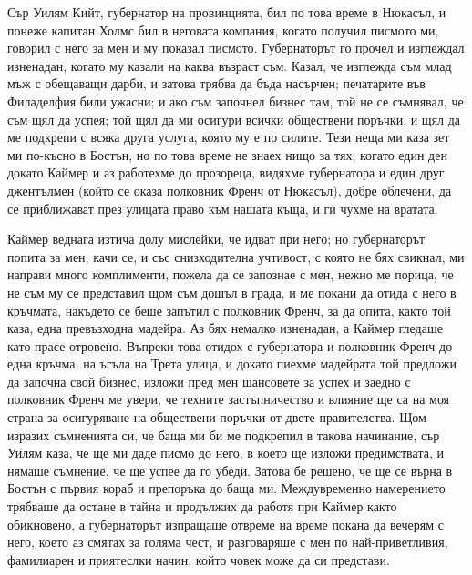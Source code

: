 \documentclass[12pt]{book}
\begin{document}
Сър Уилям Кийт, губернатор на провинцията, бил по това време в Нюкасъл, и понеже капитан Холмс бил в неговата компания, когато получил писмото ми, говорил с него за мен и му показал писмото. Губернаторът го прочел и изглеждал изненадан, когато му казали на каква възраст съм. Казал, че изглежда съм млад мъж с обещаващи дарби, и затова трябва да бъда насърчен; печатарите във Филаделфия били ужасни; и ако съм започнел бизнес там, той не се съмнявал, че съм щял да успея; той щял да ми осигури всички обществени поръчки, и щял да ме подкрепи с всяка друга услуга, която му е по силите. Тези неща ми каза зет ми по-късно в Бостън, но по това време не знаех нищо за тях; когато един ден докато Каймер и аз работехме до прозореца, видяхме губернатора и един друг джентълмен (който се оказа полковник Френч от Нюкасъл), добре облечени, да се приближават през улицата право към нашата къща, и ги чухме на вратата.

Каймер веднага изтича долу мислейки, че идват при него; но губернаторът попита за мен, качи се, и със снизходителна учтивост, с която не бях свикнал, ми направи много комплименти, пожела да се запознае с мен, нежно ме порица, че не съм му се представил щом съм дошъл в града, и ме покани да отида с него в кръчмата, накъдето се беше запътил с полковник Френч, за да опита, както той каза, една превъзходна мадейра. Аз бях немалко изненадан, а Каймер гледаше като прасе отровено. Въпреки това отидох с губернатора и полковник Френч до една кръчма, на ъгъла на Трета улица, и докато пиехме мадейрата той предложи да започна свой бизнес, изложи пред мен шансовете за успех и заедно с полковник Френч ме увери, че техните застъпничество и влияние ще са на моя страна за осигуряване на обществени поръчки от двете правителства. Щом изразих съмненията си, че баща ми би ме подкрепил в такова начинание, сър Уилям каза, че ще ми даде писмо до него, в което ще изложи предимствата, и нямаше съмнение, че ще успее да го убеди. Затова бе решено, че ще се върна в Бостън с първия кораб и препоръка до баща ми. Междувременно намерението трябваше да остане в тайна и продължих да работя при Каймер както обикновено, а губернаторът изпращаше отвреме на време покана да вечерям с него, което аз смятах за голяма чест, и разговаряше с мен по най-приветливия, фамилиарен и приятеслки начин, който човек може да си представи.
\end{document}
